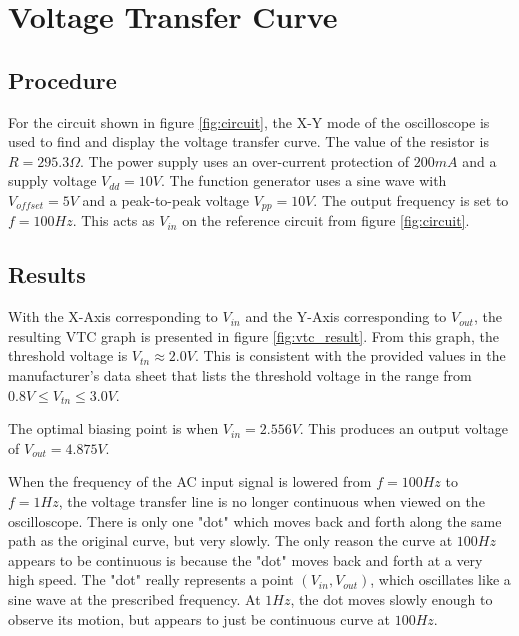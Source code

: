
\section{Voltage Transfer Curve}

\subsection{Procedure}

For the circuit shown in figure \ref{fig:circuit}, the X-Y mode of the oscilloscope is used to find and display the voltage transfer curve. The value of the resistor is $R=295.3 \Omega$. The power supply uses an over-current protection of $200mA$ and a supply voltage $V_{dd} = 10V$. The function generator uses a sine wave with $V_{offset} = 5V$ and a peak-to-peak voltage $V_{pp} = 10V$. The output frequency is set to $f = 100 Hz$. This acts as $V_{in}$ on the reference circuit from figure \ref{fig:circuit}.

\FloatBarrier

\subsection{Results}
With the X-Axis corresponding to $V_{in}$ and the Y-Axis corresponding to $V_{out}$, the resulting VTC graph is presented in figure \ref{fig:vtc_result}. From this graph, the threshold voltage is $V_{tn}\approx 2.0V$. This is consistent with the provided values in the manufacturer's data sheet that lists the threshold voltage in the range from $0.8 V \le V_{tn} \le 3.0 V$.

The optimal biasing point is when $V_{in} = 2.556 V$. This produces an output voltage of $V_{out} = 4.875 V$.

When the frequency of the AC input signal is lowered from $f=100Hz$ to $f=1 Hz$, the voltage transfer line is no longer continuous when viewed on the oscilloscope. There is only one "dot" which moves back and forth along the same path as the original curve, but very slowly. The only reason the curve at $100 Hz$ appears to be continuous is because the "dot" moves back and forth at a very high speed. The "dot" really represents a point $(V_{in},V_{out})$, which oscillates like a sine wave at the prescribed frequency. At $1 Hz$, the dot moves slowly enough to observe its motion, but appears to just be continuous curve at $100 Hz$.

